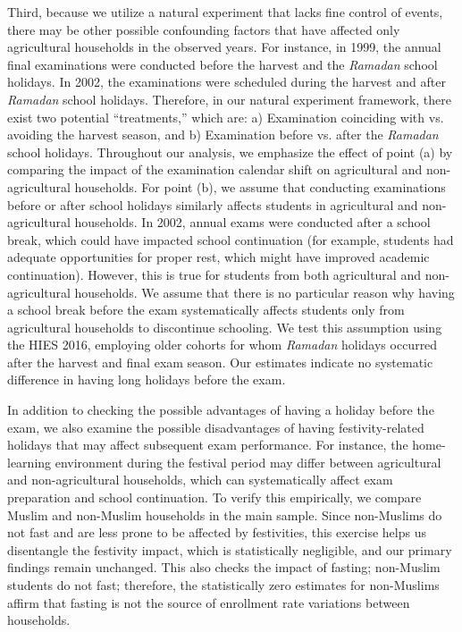 \documentclass[12pt,letterpaper]{article}
\newcommand{\0}{\ensuremath{\mbox{\boldmath $0$}}}
\begin{document}
Third, because we utilize a natural experiment that lacks fine control of events, there may be other possible confounding factors that have affected only agricultural households in the observed years. For instance, in 1999, the annual final examinations were conducted before the harvest and the \textit{Ramadan} school holidays. In 2002, the examinations were scheduled during the harvest and after \textit{Ramadan} school holidays. Therefore, in our natural experiment framework, there exist two potential ``treatments,'' which are: a) Examination coinciding with vs. avoiding the harvest season, and b) Examination before vs. after the \textit{Ramadan} school holidays. Throughout our analysis, we emphasize the effect of point (a) by comparing the impact of the examination calendar shift on agricultural and non-agricultural households. For point (b), we assume that conducting examinations before or after school holidays similarly affects students in agricultural and non-agricultural households. In 2002, annual exams were conducted after a school break, which could have impacted school continuation (for example, students had adequate opportunities for proper rest, which might have improved academic continuation). However, this is true for students from both agricultural and non-agricultural households. We assume that there is no particular reason why having a school break before the exam systematically affects students only from agricultural households to discontinue schooling. We test this assumption using the HIES 2016, employing older cohorts for whom \textit{Ramadan} holidays occurred after the harvest and final exam season. Our estimates indicate no systematic difference in having long holidays before the exam. 

In addition to checking the possible advantages of having a holiday before the exam, we also examine the possible disadvantages of having festivity-related holidays that may affect subsequent exam performance. For instance, the home-learning environment during the festival period may differ between agricultural and non-agricultural households, which can systematically affect exam preparation and school continuation. To verify this empirically, we compare Muslim and non-Muslim households in the main sample. Since non-Muslims do not fast and are less prone to be affected by festivities, this exercise helps us disentangle the festivity impact, which is statistically negligible, and our primary findings remain unchanged. This also checks the impact of fasting; non-Muslim students do not fast; therefore, the statistically zero estimates for non-Muslims affirm that fasting is not the source of enrollment rate variations between households. 
\end{document}
